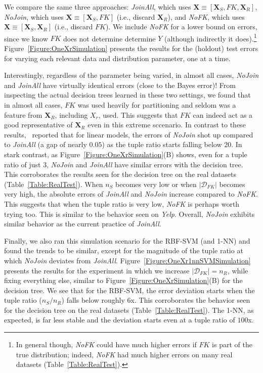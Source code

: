 \documentclass{vldb}
\begin{document}
We compare the same three approaches: \textit{JoinAll}, which uses $\textbf{X} \equiv [\textbf{X}_S, FK, \textbf{X}_R]$, 
\textit{NoJoin}, which uses $\textbf{X} \equiv [\textbf{X}_S, FK]$ (i.e., discard $\textbf{X}_R$), and \textit{NoFK}, 
which uses $\textbf{X} \equiv [\textbf{X}_S, \textbf{X}_R]$ (i.e., discard $FK$).
We include \textit{NoFK} for a lower bound on errors, since we know $FK$ does not determine determine $Y$ (although indirectly it 
does).\footnote{In general though, \textit{NoFK} could have much higher errors if $FK$ is part of the true distribution; indeed, \textit{NoFK} had 
much higher errors on many real datasets (Table~\ref{Table:RealTest}).}
Figure~\ref{Figure:OneXrSimulation} presents the results for the (holdout) test errors for varying each relevant data and distribution parameter, one at a time.

Interestingly, regardless of the parameter being varied, in almost all cases, \textit{NoJoin} and \textit{JoinAll} have virtually identical errors (close to the Bayes 
error)! From inspecting the actual decision trees learned in these two settings, we found that in almost all cases, $FK$ was used heavily for partitioning and seldom was 
a feature from $\textbf{X}_R$, including $X_r$, used. This suggests that $FK$ can indeed act as a good representative of $\textbf{X}_R$ even in this extreme sccenario. 
In contrast to these results,~\cite{hamlet} reported that for linear models, the errors of \textit{NoJoin} shot up compared to \textit{JoinAll} (a gap of nearly $0.05$)
as the tuple ratio starts falling below $20$. In stark contrast, as Figure~\ref{Figure:OneXrSimulation}(B) shows, even for a tuple ratio of just $3$, \textit{NoJoin} 
and \textit{JoinAll} have similar errors with the decision tree. This corroborates the results seen for the decision tree on the real datasets (Table~\ref{Table:RealTest}).
When $n_S$ becomes very low or when $|\mathcal{D}_{FK}|$ becomes very high, the absolute errors of \textit{JoinAll} and \textit{NoJoin} increase compared to \textit{NoFK}. 
This suggests that when the tuple ratio is very low, \textit{NoFK} is perhaps worth trying too. This is similar to the behavior seen on \textit{Yelp}. 
Overall, \textit{NoJoin} exhibits similar behavior as the current practice of \textit{JoinAll}.

Finally, we also ran this simulation scenario for the RBF-SVM (and 1-NN) and found the trends to be similar, except for the magnitude of the tuple ratio at which 
\textit{NoJoin} deviates from \textit{JoinAll}. Figure~\ref{Figure:OneXr1nnSVMSimulation} presents the results for the experiment in which we increase $|\mathcal{D}_{FK}|=n_R$, 
while fixing everything else, similar to Figure~\ref{Figure:OneXrSimulation}(B) for the decision tree. We see that for the RBF-SVM, the error deviation starts when the 
tuple ratio ($n_S/n_R$) falls below roughly $6$x. This corroborates the behavior seen for the decision tree on the real datasets (Table~\ref{Table:RealTest}).
The 1-NN, as expected, is far less stable and the deviation starts even at a tuple ratio of $100$x.
\end{document}
